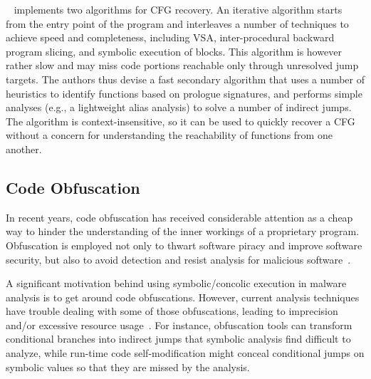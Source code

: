~\cite{ANGR-SP16} implements two algorithms for CFG recovery. An iterative algorithm starts from the entry point of the program and interleaves a number of techniques to achieve speed and completeness, including VSA, inter-procedural backward program slicing, and symbolic execution of blocks. This algorithm is however rather slow and may miss code portions reachable only through unresolved jump targets. The authors thus devise a fast secondary algorithm that uses a number of heuristics to identify functions based on prologue signatures, and performs simple analyses (e.g., a lightweight alias analysis) to solve a number of indirect jumps. The algorithm is context-insensitive, so it can be used to quickly recover a CFG without a concern for understanding the reachability of functions from one another. 

\subsection{Code Obfuscation}
In recent years, code obfuscation has received considerable attention as a cheap way to hinder the understanding of the inner workings of a proprietary program. Obfuscation is employed not only to thwart software piracy and improve software security, but also to avoid detection and resist analysis for malicious software~\cite{UDM-WCRE15,YJW-SSP15}.

A significant motivation behind using symbolic/concolic execution in malware analysis is to get around code obfuscations. However, current analysis techniques have trouble dealing with some of those obfuscations, leading to imprecision and/or excessive resource usage~\cite{YD-CCS15}. For instance, obfuscation tools can transform conditional branches into indirect jumps that symbolic analysis find difficult to analyze, while run-time code self-modification might conceal conditional jumps on symbolic values so that they are missed by the analysis.

